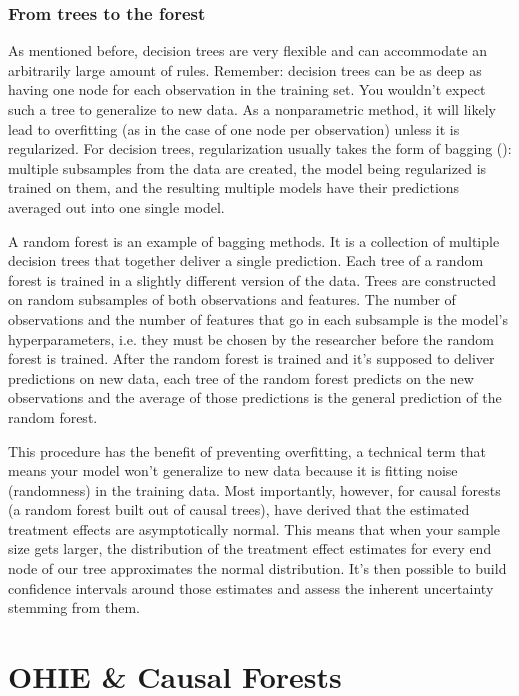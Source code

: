 \subsubsection{From trees to the forest}

As mentioned before, decision trees are very flexible and can accommodate an arbitrarily large amount of rules. Remember: decision trees can be as deep as having one node for each observation in the training set. You wouldn't expect such a tree to generalize to new data. %
As a nonparametric method, it will likely lead to overfitting (as in the case of one node per observation) unless it is regularized. For decision trees, regularization usually takes the form of bagging (\cite{breimanHeuristicsInstabilityStabilization1996}): multiple subsamples from the data are created, the model being regularized is trained on them, and the resulting multiple models have their predictions averaged out into one single model.

A random forest is an example of bagging methods. It is a collection of multiple decision trees that together deliver a single prediction. Each tree of a random forest is trained in a slightly different version of the data. Trees are constructed on random subsamples of both observations and features. The number of observations and the number of features that go in each subsample is the model's hyperparameters, i.e. they must be chosen by the researcher before the random forest is trained. After the random forest is trained and it's supposed to deliver predictions on new data, each tree of the random forest predicts on the new observations and the average of those predictions is the general prediction of the random forest.

This procedure has the benefit of preventing overfitting, a technical term that means your model won't generalize to new data because it is fitting noise (randomness) in the training data. Most importantly, however, for causal forests (a random forest built out of causal trees), \cite{atheyGeneralizedRandomForests2016} have derived that the estimated treatment effects are asymptotically normal. This means that when your sample size gets larger, the distribution of the treatment effect estimates for every end node of our tree approximates the normal distribution. It's then possible to build confidence intervals around those estimates and assess the inherent uncertainty stemming from them.

\newpage

\section{OHIE \& Causal Forests}

